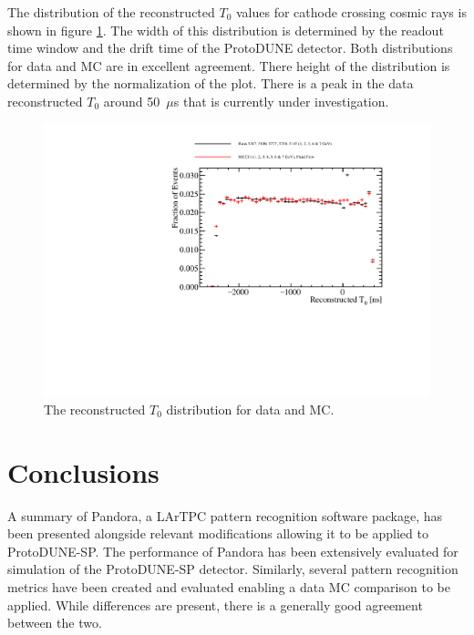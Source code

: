 The distribution of the reconstructed $T_{0}$ values for cathode crossing cosmic rays is shown in figure \ref{fig:recoT0data}.  The width of this distribution is determined by the readout time window and the drift time of the ProtoDUNE detector.  Both distributions for data and MC are in excellent agreement.  There height of the distribution is determined by the normalization of the plot.  There is a peak in the data reconstructed $T_{0}$ around 50~$\mu$s that is currently under investigation.  %

\begin{figure}
\includegraphics[width=1.0\textwidth]{Figures/Metrics/Data/Cosmics/StitchedT0.pdf}
\caption{The reconstructed $T_{0}$ distribution for data and MC.}
\label{fig:recoT0data}
\end{figure}

\section{Conclusions}

A summary of Pandora, a LArTPC pattern recognition software package, has been presented alongside relevant modifications allowing it to be applied to ProtoDUNE-SP.  The performance of Pandora has been extensively evaluated for simulation of the ProtoDUNE-SP detector.  Similarly, several pattern recognition metrics have been created and evaluated enabling a data MC comparison to be applied.  While differences are present, there is a generally good agreement between the two.  

